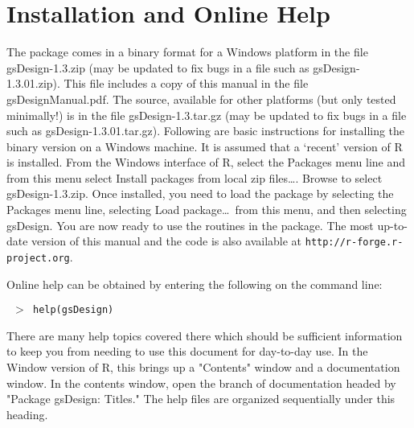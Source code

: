 \section{Installation and Online Help\label{sec:install}}

The package comes in a binary format for a Windows platform in the file
gsDesign-1.3.zip (may be updated to fix bugs in a file such as
gsDesign-1.3.01.zip). This file includes a copy of this manual in the file
gsDesignManual.pdf. The source, available for other platforms (but only tested
minimally!) is in the file gsDesign-1.3.tar.gz (may be updated to fix bugs in
a file such as gsDesign-1.3.01.tar.gz). Following are basic instructions for
installing the binary version on a Windows machine. It is assumed that a
`recent' version of R is installed. From the Windows interface of R, select
the Packages menu line and from this menu select Install packages from local
zip files\ldots. Browse to select gsDesign-1.3.zip. Once installed, you need
to load the package by selecting the Packages menu line, selecting Load
package\ldots\ from this menu, and then selecting gsDesign. You are now ready
to use the routines in the package. The most up-to-date version of this manual
and the code is also available at \texttt{http://r-forge.r-project.org}.

\bigskip

Online help can be obtained by entering the following on the command line:

\bigskip

\texttt{%
$>$
help(gsDesign)}

\bigskip

There are many help topics covered there which should be sufficient
information to keep you from needing to use this document for day-to-day use.
In the Window version of R, this brings up a "Contents" window and a
documentation window. In the contents window, open the branch of documentation
headed by "Package gsDesign: Titles." The help files are organized
sequentially under this heading. 

